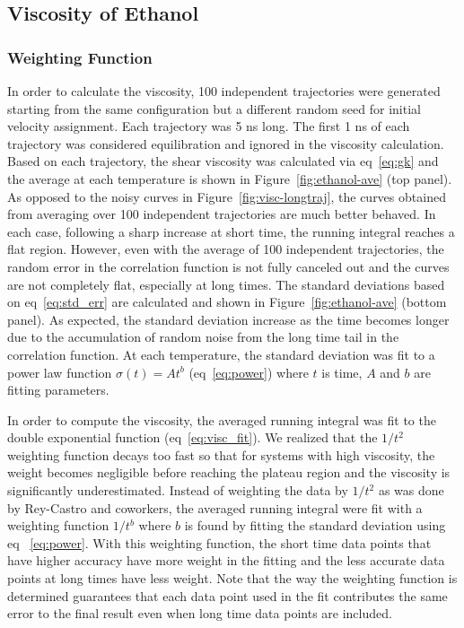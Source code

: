 \documentclass[12pt]{article}
\begin{document}
\subsection{Viscosity of Ethanol}

\subsubsection{Weighting Function}

In order to calculate the viscosity,
100 independent trajectories were generated starting from the same configuration but a different random seed for initial velocity assignment.
Each trajectory was 5 ns long.
The first 1 ns of each trajectory was considered equilibration and ignored in the viscosity calculation.
Based on each trajectory, 
the shear viscosity was calculated via eq~\ref{eq:gk} 
and the average at each temperature is shown in Figure~\ref{fig:ethanol-ave} (top panel).
As opposed to the noisy curves in Figure~\ref{fig:visc-longtraj},
the curves obtained from averaging over 100 independent trajectories are much better behaved.
In each case, following a sharp increase at short time,
the running integral reaches a flat region.
However, even with the average of 100 independent trajectories,
the random error in the correlation function is not fully canceled out and the curves are not completely flat,
especially at long times.
The standard deviations based on eq~\ref{eq:std_err} are calculated and shown in Figure~\ref{fig:ethanol-ave} (bottom panel).
As expected, the standard deviation increase as the time becomes longer due to the accumulation of random noise from the long time tail in the correlation function.
\cite{Verlet.PRA.7.1690.1973}
At each temperature,
the standard deviation was fit to a power law function $\sigma(t) = At^{b}$ (eq~\ref{eq:power}) 
where $t$ is time, $A$ and $b$ are fitting parameters.

In order to compute the viscosity,
the averaged running integral was fit to the double exponential function (eq~\ref{eq:visc_fit}).
\cite{Rey-Castro.JPC.B.110.14426.2006}
We realized that the $1/t^2$ weighting function decays too fast 
so that for systems with high viscosity, 
the weight becomes negligible before reaching the plateau region
and the viscosity is significantly underestimated. Instead of weighting the data by $1/t^2$ as was done by Rey-Castro and coworkers,
\cite{Rey-Castro.JPC.B.110.14426.2006}
the averaged running integral were fit with a weighting function $1/t^b$ where $b$ is found by fitting the standard deviation using eq~ \ref{eq:power}.
With this weighting function,
the short time data points that have higher accuracy have more weight in the fitting
and the less accurate data points at long times have less weight.
Note that the way the weighting function is determined guarantees 
that each data point used in the fit contributes the same error to the final result
even when long time data points are included.
\end{document}
